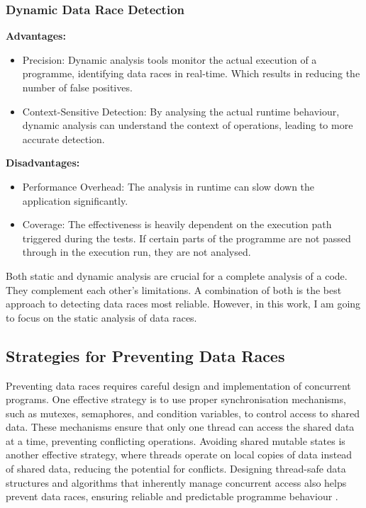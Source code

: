 \documentclass[
fancyheadings, %
%
%
]{stsreprt}
\begin{document}
{\subsubsection{Dynamic Data Race Detection \cite{flanagan2009}}
\textbf{Advantages:}
\begin{itemize}
	\item Precision: Dynamic analysis tools monitor the actual execution of a programme, identifying data races in real-time. Which results in reducing the number of false positives.
	\item Context-Sensitive Detection: By analysing the actual runtime behaviour, dynamic analysis can understand the context of operations, leading to more accurate detection. 
\end{itemize}
\textbf{Disadvantages:}
\begin{itemize}
	\item Performance Overhead: The analysis in runtime can slow down the application significantly. 
	\item Coverage: The effectiveness is heavily dependent on the execution path triggered during the tests. If certain parts of the programme are not passed through in the execution run, they are not analysed.
\end{itemize}

Both static and dynamic analysis are crucial for a complete analysis of a code. They complement each other's limitations. A combination of both is the best approach to detecting data races most reliable. However, in this work, I am going to focus on the static analysis of data races.


\subsection{Strategies for Preventing Data Races}

Preventing data races requires careful design and implementation of concurrent programs. One effective strategy is to use proper synchronisation mechanisms, such as mutexes, semaphores, and condition variables, to control access to shared data. These mechanisms ensure that only one thread can access the shared data at a time, preventing conflicting operations. Avoiding shared mutable states is another effective strategy, where threads operate on local copies of data instead of shared data, reducing the potential for conflicts. Designing thread-safe data structures and algorithms that inherently manage concurrent access also helps prevent data races, ensuring reliable and predictable programme behaviour \cite{herlihy2008}.

}
\end{document}

